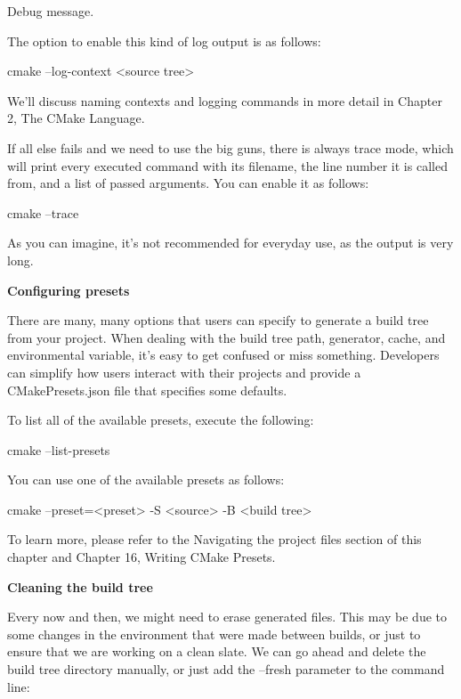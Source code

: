 \begin{shell}
 Debug message.
\end{shell}

The option to enable this kind of log output is as follows:

\begin{shell}
cmake --log-context <source tree>
\end{shell}

We’ll discuss naming contexts and logging commands in more detail in Chapter 2, The CMake Language.

If all else fails and we need to use the big guns, there is always trace mode, which will print every executed command with its filename, the line number it is called from, and a list of passed arguments. You can enable it as follows:

\begin{shell}
cmake --trace
\end{shell}

As you can imagine, it’s not recommended for everyday use, as the output is very long.

\noindent
\textbf{Configuring presets}

There are many, many options that users can specify to generate a build tree from your project. When dealing with the build tree path, generator, cache, and environmental variable, it’s easy to get confused or miss something. Developers can simplify how users interact with their projects and provide a CMakePresets.json file that specifies some defaults.

To list all of the available presets, execute the following:

\begin{shell}
cmake --list-presets
\end{shell}

You can use one of the available presets as follows:

\begin{shell}
cmake --preset=<preset> -S <source> -B <build tree>
\end{shell}

To learn more, please refer to the Navigating the project files section of this chapter and Chapter 16, Writing CMake Presets.

\noindent
\textbf{Cleaning the build tree}

Every now and then, we might need to erase generated files. This may be due to some changes in the environment that were made between builds, or just to ensure that we are working on a clean slate. We can go ahead and delete the build tree directory manually, or just add the --fresh parameter to the command line:

